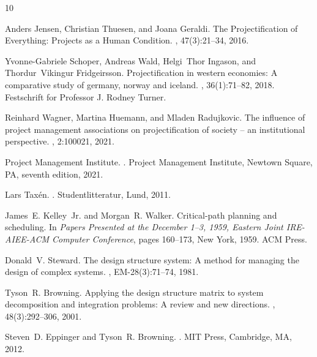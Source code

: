 \documentclass[11pt,a4paper]{article}
\begin{document}
\begin{thebibliography}{10}

Anders Jensen, Christian Thuesen, and Joana Geraldi.
\newblock The {Projectification} of {Everything}: {Projects} as a {Human}
  {Condition}.
, 47(3):21--34, 2016.

Yvonne-Gabriele Schoper, Andreas Wald, Helgi~Thor Ingason, and Thordur~Vikingur
  Fridgeirsson.
\newblock Projectification in western economies: A comparative study of
  germany, norway and iceland.
, 36(1):71--82,
  2018.
\newblock Festschrift for Professor J. Rodney Turner.

Reinhard Wagner, Martina Huemann, and Mladen Radujkovic.
\newblock The influence of project management associations on projectification
  of society – an institutional perspective.
, 2:100021, 2021.

{Project Management Institute}.
.
\newblock Project Management Institute, Newtown Square, PA, seventh edition,
  2021.

Lars Tax{\'e}n.
.
\newblock Studentlitteratur, Lund, 2011.

James~E. Kelley~Jr. and Morgan~R. Walker.
\newblock Critical-path planning and scheduling.
\newblock In {\em Papers Presented at the December 1--3, 1959, Eastern Joint
  IRE-AIEE-ACM Computer Conference}, pages 160--173, New York, 1959. ACM Press.

Donald~V. Steward.
\newblock The design structure system: A method for managing the design of
  complex systems.
,
  EM-28(3):71--74, 1981.

Tyson~R. Browning.
\newblock Applying the design structure matrix to system decomposition and
  integration problems: A review and new directions.
, 48(3):292--306,
  2001.

Steven~D. Eppinger and Tyson~R. Browning.
.
\newblock MIT Press, Cambridge, MA, 2012.


\end{thebibliography}
\end{document}
